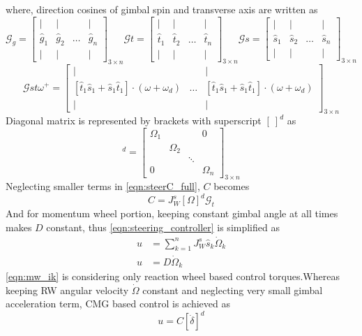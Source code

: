 where, direction cosines of gimbal spin and transverse axis are written as
\begin{equation*}
\mathcal{G}_{g} =\begin{bmatrix}
| & | &  & |\\
\hat{g}_{1} & \hat{g}_{2} & \dotsc  & \hat{g}_{n}\\
| & | &  & |
\end{bmatrix}_{3\times n}  \mathcal{G} t=\begin{bmatrix}
| & | &  & |\\
\hat{t}_{1} & \hat{t}_{2} & \dotsc  & \hat{t}_{n}\\
| & | &  & |
\end{bmatrix}_{3\times n}  \mathcal{G} s=\begin{bmatrix}
| & | &  & |\\
\hat{s}_{1} & \hat{s}_{2} & \dotsc  & \hat{s}_{n}\\
| & | &  & |
\end{bmatrix}_{3\times n}
\end{equation*}
\begin{equation*}
\mathcal{G} st\omega ^{+} =\begin{bmatrix}
| &  & |\\
[\hat{t}_{1}\hat{s}_{1} +\hat{s}_{1}\hat{t}_{1}] \cdotp ( \omega +\omega _{d}) & \dotsc  & [\hat{t}_{1}\hat{s}_{1} +\hat{s}_{1}\hat{t}_{1}] \cdotp ( \omega +\omega _{d})\\
| &  & |
\end{bmatrix}_{3\times n}
\end{equation*}Diagonal matrix is represented by brackets with superscript $\displaystyle [ \ ]^{d}$ as
\begin{equation*}
[ \Omega ]^{d} =\begin{bmatrix}
\Omega _{1} &  &  & 0\\
 & \Omega _{2} &  & \\
 &  & \ddots  & \\
0 &  &  & \Omega _{n}
\end{bmatrix}_{3\times n}
\end{equation*}
Neglecting smaller terms in \autoref{eqn:steerC_full}, $\displaystyle C$ becomes
\begin{equation}
C=J^{s}_{W}[ \Omega ]^{d}\mathcal{G}_{t}
\end{equation}
And for momentum wheel portion, keeping constant gimbal angle at all times makes $\displaystyle D$ constant, thus \autoref{eqn:steering_controller} is simplified as
\begin{equation}
\begin{aligned}
u & =\sum ^{n}_{k=1} J^{s}_{W}\hat{s}_{k}\dot{\Omega }_{k}\\
u & =D\dot{\Omega }_{k}
\end{aligned}
\label{eqn:mw_ik}
\end{equation}
\autoref{eqn:mw_ik} is considering only reaction wheel based control torques.Whereas keeping RW angular velocity $\displaystyle \dot{\Omega }$ constant and neglecting very small gimbal acceleration term, CMG based control is achieved as 
\begin{equation}
u=C[\dot{\delta }]^{d}
\label{eqn:cmg_control_only}
\end{equation}
